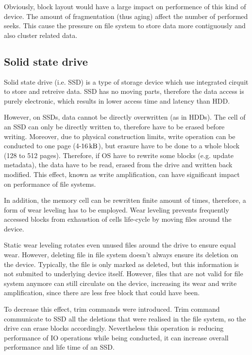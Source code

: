\documentclass[
  color, %
  table, %
  lof,   %
  lot,   %
]{fithesis3}
\begin{document}
Obviously, block layout would have a large impact on performence of this kind of device. The amount of fragmentation (thus aging) affect the number of performed seeks. This cause the pressure on file system to store data more contiguously and also cluster related data.

\subsection{Solid state drive}
Solid state drive (i.e. SSD) is  a type of storage device which use integrated cirquit to store and retreive data. SSD has no moving parts, therefore the data access is purely electronic, which results in lower access time and latency than HDD.

However, on SSDs, data cannot be directly overwritten (as in HDDs). The cell of an SSD can only be directly written to, therefore have to be erased before writing. Moreover, due to physical construction limits, write operation can be conducted to one page (4-$\SI{16}{\kilo\byte}$), but erasure have to be done to a whole block (128 to 512 pages). Therefore, if OS have to rewrite some blocks (e.g. update metadata), the data have to be read, erased from the drive and written back modified. This effect, known as write amplification, can have significant impact on performance of file systems. 

In addition, the memory cell can be rewritten finite amount of times, therefore, a form of wear leveling has to be employed. Wear leveling prevents frequently accessed blocks from exhaustion of cells life-cycle by moving files around the device.

Static wear leveling rotates even unused files around the drive to ensure equal wear. However, deleting file in file system doesn't always ensure its deletion on the device. Typically, the file is only marked as deleted, but this information is not submited to underlying device itself. However, files that are not valid for file system anymore can still circulate on the device, increasing its wear and write amplification, since there are less free block that could have been.

To decrease this effect, trim commands were introduced. Trim command communicate to SSD all the deletions that were realised in the file system, so the drive can erase blocks accordingly. Nevertheless this operation is reducing performance of IO operations while being conducted, it can increase overall performance and life time of an SSD.
\end{document}

